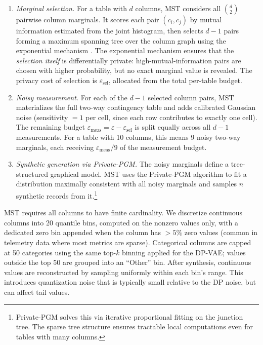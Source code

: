 \documentclass[12pt,letterpaper]{article}
\renewcommand{\_}{\textunderscore\allowbreak}
\begin{document}
\begin{enumerate}
    \item \textit{Marginal selection.} For a table with $d$ columns, MST considers all $\binom{d}{2}$ pairwise column marginals. It scores each pair $(c_i, c_j)$ by mutual information estimated from the joint histogram, then selects $d - 1$ pairs forming a maximum spanning tree over the column graph using the exponential mechanism \citep{mcsherry2007mechanism}. The exponential mechanism ensures that the \textit{selection itself} is differentially private: high-mutual-information pairs are chosen with higher probability, but no exact marginal value is revealed. The privacy cost of selection is $\varepsilon_{\text{sel}}$, allocated from the total per-table budget.
    
    \item \textit{Noisy measurement.} For each of the $d - 1$ selected column pairs, MST materializes the full two-way contingency table and adds calibrated Gaussian noise (sensitivity $= 1$ per cell, since each row contributes to exactly one cell). The remaining budget $\varepsilon_{\text{meas}} = \varepsilon - \varepsilon_{\text{sel}}$ is split equally across all $d - 1$ measurements. For a table with 10 columns, this means 9 noisy two-way marginals, each receiving $\varepsilon_{\text{meas}} / 9$ of the measurement budget.
    
    \item \textit{Synthetic generation via Private-PGM.} The noisy marginals define a tree-structured graphical model. MST uses the Private-PGM algorithm \citep{mckenna2019graphical} to fit a distribution maximally consistent with all noisy marginals and samples $n$ synthetic records from it.\footnote{Private-PGM solves this via iterative proportional fitting on the junction tree. The sparse tree structure ensures tractable local computations even for tables with many columns.}
\end{enumerate}

MST requires all columns to have finite cardinality. We discretize continuous columns into 20 quantile bins, computed on the nonzero values only, with a dedicated zero bin appended when the column has $> 5\%$ zero values (common in telemetry data where most metrics are sparse). Categorical columns are capped at 50 categories using the same top-$k$ binning applied for the DP-VAE; values outside the top 50 are grouped into an ``Other'' bin. After synthesis, continuous values are reconstructed by sampling uniformly within each bin's range. This introduces quantization noise that is typically small relative to the DP noise, but can affect tail values.
\end{document}
